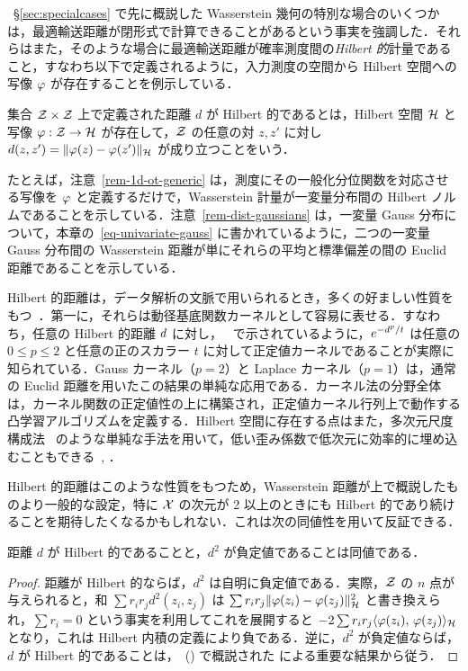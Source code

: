 ~\S\ref{sec:specialcases} で先に概説した Wasserstein 幾何の特別な場合のいくつかは，最適輸送距離が閉形式で計算できることがあるという事実を強調した．それらはまた，そのような場合に最適輸送距離が確率測度間の\emph{Hilbert 的}計量であること，すなわち以下で定義されるように，入力測度の空間から Hilbert 空間への写像 $\tphi$ が存在することを例示している．

\begin{defn}\label{def-Hilbertmetric}
集合 $\mathcal{Z}\times \mathcal{Z}$ 上で定義された距離 $d$ が Hilbert 的であるとは，Hilbert 空間 $\mathcal{H}$ と写像 $\tphi:\Z\rightarrow \RKHS$ が存在して，$\mathcal{Z}$ の任意の対 $z,z'$ に対し $d(z,z')=\|\tphi(z)-\tphi(z')\|_\RKHS$ が成り立つことをいう．
\end{defn}

たとえば，注意~\ref{rem-1d-ot-generic} は，測度にその一般化分位関数を対応させる写像を $\tphi$ と定義するだけで，Wasserstein 計量が一変量分布間の Hilbert ノルムであることを示している．注意~\ref{rem-dist-gaussians} は，一変量 Gauss 分布について，本章の~\eqref{eq-univariate-gauss} に書かれているように，二つの一変量 Gauss 分布間の Wasserstein 距離が単にそれらの平均と標準偏差の間の Euclid 距離であることを示している．

Hilbert 的距離は，データ解析の文脈で用いられるとき，多くの好ましい性質をもつ~\citep{dattorro2010convex}．第一に，それらは動径基底関数カーネルとして容易に表せる．すなわち，任意の Hilbert 的距離 $d$ に対し，~\citep[Cor. 3.3.3, Prop. 3.2.7]{berg84harmonic} で示されているように，$e^{-d^p/t}$ は任意の $0\leq p\leq 2$ と任意の正のスカラー $t$ に対して正定値カーネルであることが実際に知られている．Gauss カーネル（$p=2$）と Laplace カーネル（$p=1$）は，通常の Euclid 距離を用いたこの結果の単純な応用である．カーネル法の分野全体~\citep{Hofmann2008} は，カーネル関数の正定値性の上に構築され，正定値カーネル行列上で動作する凸学習アルゴリズムを定義する．Hilbert 空間に存在する点はまた，多次元尺度構成法~\citep{borg2005modern} のような単純な手法を用いて，低い歪み係数で低次元に効率的に埋め込むこともできる~\citep{Johnson84}, \citep[\S V.6.2]{barvinok2002course}．

Hilbert 的距離はこのような性質をもつため，Wasserstein 距離が上で概説したものより一般的な設定，特に $\mathcal{X}$ の次元が 2 以上のときにも Hilbert 的であり続けることを期待したくなるかもしれない．これは次の同値性を用いて反証できる．

\begin{prop}\label{prop-negative-definite} 距離 $d$ が Hilbert 的であることと，$d^2$ が負定値であることは同値である．
\end{prop}
\begin{proof} 距離が Hilbert 的ならば，$d^2$ は自明に負定値である．実際，$\mathcal{Z}$ の $n$ 点が与えられると，和 $\sum r_i r_j d^2(z_i,z_j)$ は $\sum r_i r_j \|\tphi(z_i)-\tphi(z_j)\|_\RKHS^2$ と書き換えられ，$\sum r_i=0$ という事実を利用してこれを展開すると $-2\sum r_i r_j \dotp{\tphi(z_i)}{\tphi(z_j)}_\RKHS$ となり，これは Hilbert 内積の定義により負である．逆に，$d^2$ が負定値ならば，$d$ が Hilbert 的であることは，~(\cite[p. 82, Prop. 3.2]{berg84harmonic}) で概説された \citet{schoenberg38} による重要な結果から従う．
\end{proof}

